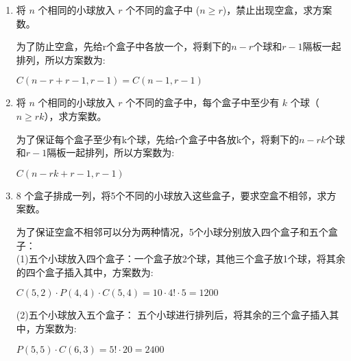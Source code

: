 \documentclass[a4paper]{article}
\begin{document}
\begin{enumerate}
\item 将 $n$ 个相同的小球放入 $r$ 个不同的盒子中 ($n \geq r$)，禁止出现空盒，求方案数。
\begin{solution}
      \begin{enumerate}
      为了防止空盒，先给r个盒子中各放一个，将剩下的$n-r$个球和$r-1$隔板一起排列，所以方案数为:\\
      \begin{center}
          $C(n-r+r-1,r-1)=C(n-1,r-1)$    
      \end{center}
      
\end{enumerate}
\end{solution}

\item 将 $n$ 个相同的小球放入 $r$ 个不同的盒子中，每个盒子中至少有 $k$ 个球（$n \geq rk$），求方案数。
\begin{solution}
      \begin{enumerate}
      为了保证每个盒子至少有k个球，先给r个盒子中各放k个，将剩下的$n-rk$个球和$r-1$隔板一起排列，所以方案数为:\\
      \begin{center}
           $C(n-rk+r-1,r-1)$   
      \end{center}
      
\end{enumerate}
\end{solution}

\item 8 个盒子排成一列，将5个不同的小球放入这些盒子，要求空盒不相邻，求方案数。
\begin{solution}
      \begin{enumerate}
      为了保证空盒不相邻可以分为两种情况，5个小球分别放入四个盒子和五个盒子：\\
      (1)五个小球放入四个盒子：一个盒子放2个球，其他三个盒子放1个球，将其余的四个盒子插入其中，方案数为:\\
      \begin{center}
            $C(5,2)\cdot P(4,4)\cdot C(5,4)=10\cdot 4!\cdot 5=1200$\\
      \end{center}
      
      (2)五个小球放入五个盒子： 五个小球进行排列后，将其余的三个盒子插入其中，方案数为:\\
      \begin{center}
         $P(5,5)\cdot C(6,3)=5!\cdot 20=2400$ \\   
      \end{center}
      

\end{enumerate}
\end{solution}
\end{enumerate}
\end{document}
